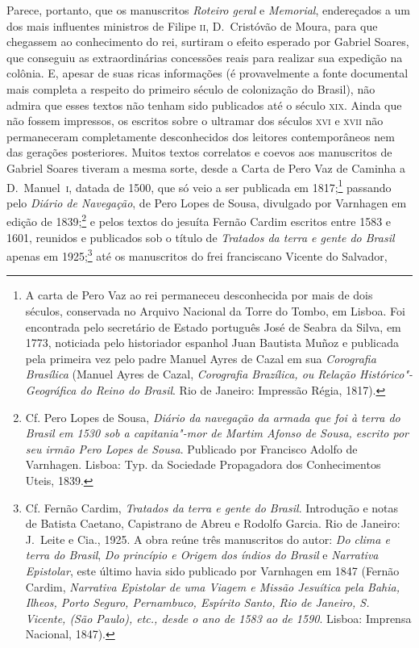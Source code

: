  Parece, portanto, que os manuscritos \textit{Roteiro geral} e
\textit{Memorial}, endereçados a um dos mais influentes ministros de
Filipe 	\textsc{ii}, D.~Cristóvão de Moura, para que chegassem ao conhecimento do
rei, surtiram o efeito esperado por Gabriel Soares, que conseguiu as
extraordinárias concessões reais para realizar sua expedição na
colônia. E, apesar de suas ricas informações (é provavelmente a fonte
documental mais completa a respeito do primeiro século de colonização
do Brasil), não admira que esses textos não tenham sido publicados até
o século \textsc{xix}. Ainda que não fossem impressos, os escritos sobre o
ultramar dos séculos \textsc{xvi} e \textsc{xvii} não permaneceram completamente
desconhecidos dos leitores contemporâneos nem das gerações posteriores.
Muitos textos correlatos e coevos aos manuscritos de Gabriel Soares
tiveram a mesma sorte, desde a Carta de Pero Vaz de Caminha a D.~Manuel~\textsc{i}, 
datada de 1500, que só veio a ser publicada em 1817;\footnote{ A
carta de Pero Vaz ao rei permaneceu desconhecida por mais de dois
séculos, conservada no Arquivo Nacional da Torre do Tombo, em Lisboa.
Foi encontrada pelo secretário de Estado português José de Seabra da
Silva, em 1773, noticiada pelo historiador espanhol Juan Bautista Muñoz
e publicada pela primeira vez pelo padre Manuel Ayres de Cazal em sua
\textit{Corografia Brasílica} (Manuel Ayres de Cazal,		
\textit{Corografia Brazílica, ou Relação Histórico"-Geográfica do Reino
do Brasil}. Rio de Janeiro: Impressão Régia, 1817).} passando pelo
\textit{Diário de Navegação}, de Pero Lopes de Sousa, divulgado por
Varnhagen em edição de 1839;\footnote{ Cf. Pero Lopes de Sousa, \textit{Diário da navegação da armada que 
foi à terra do Brasil em 1530 sob a capitania"-mor de Martim Afonso de Sousa,
escrito por seu irmão Pero Lopes de Sousa}. Publicado por Francisco Adolfo de Varnhagen. 
Lisboa: Typ. da Sociedade Propagadora dos Conhecimentos Uteis, 1839.} e pelos textos do jesuíta Fernão Cardim
escritos entre 1583 e 1601, reunidos e publicados 
sob o título de \textit{Tratados da terra e gente do Brasil} apenas em
1925;\footnote{ Cf. Fernão Cardim, \textit{Tratados da terra e gente do Brasil}. 
Introdução e notas de Batista Caetano, Capistrano de Abreu e Rodolfo Garcia. 
Rio de Janeiro: J.~Leite e Cia., 1925. 
A obra reúne três manuscritos do autor: \textit{Do clima e terra do Brasil}, \textit{Do princípio e Origem dos índios do Brasil}
e \textit{Narrativa Epistolar}, este último havia sido publicado por Varnhagen em 1847 (Fernão Cardim, \textit{Narrativa Epistolar de uma
Viagem e Missão Jesuítica pela Bahia, Ilheos, Porto Seguro, Pernambuco, Espírito Santo, Rio de Janeiro, S. Vicente, (São Paulo), 
etc., desde o ano de 1583 ao de 1590}. Lisboa: Imprensa Nacional, 1847).} até os manuscritos do frei franciscano Vicente do Salvador,
